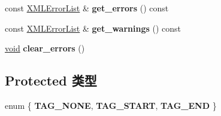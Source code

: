 \begin{DoxyCompactItemize}
\item 
\mbox{\label{struct_x_m_l_storage_1_1_x_m_l_reader_base_ac3299d3ac3bb09e933f662ec6013ef93}} 
const \hyperlink{struct_x_m_l_storage_1_1_x_m_l_error_list}{X\+M\+L\+Error\+List} \& {\bfseries get\+\_\+errors} () const
\item 
\mbox{\label{struct_x_m_l_storage_1_1_x_m_l_reader_base_a2c11b953a9e7b2f2d3884806bafd170e}} 
const \hyperlink{struct_x_m_l_storage_1_1_x_m_l_error_list}{X\+M\+L\+Error\+List} \& {\bfseries get\+\_\+warnings} () const
\item 
\mbox{\label{struct_x_m_l_storage_1_1_x_m_l_reader_base_a015221f9ff1d0e0501d077ded0f41438}} 
\hyperlink{interfacevoid}{void} {\bfseries clear\+\_\+errors} ()
\end{DoxyCompactItemize}
\subsection*{Protected 类型}
\begin{DoxyCompactItemize}
\item 
\mbox{\label{struct_x_m_l_storage_1_1_x_m_l_reader_base_af920b7270cda6647d8089262aa435d0f}} 
enum \{ {\bfseries T\+A\+G\+\_\+\+N\+O\+NE}, 
{\bfseries T\+A\+G\+\_\+\+S\+T\+A\+RT}, 
{\bfseries T\+A\+G\+\_\+\+E\+ND}
 \}
\end{DoxyCompactItemize}
